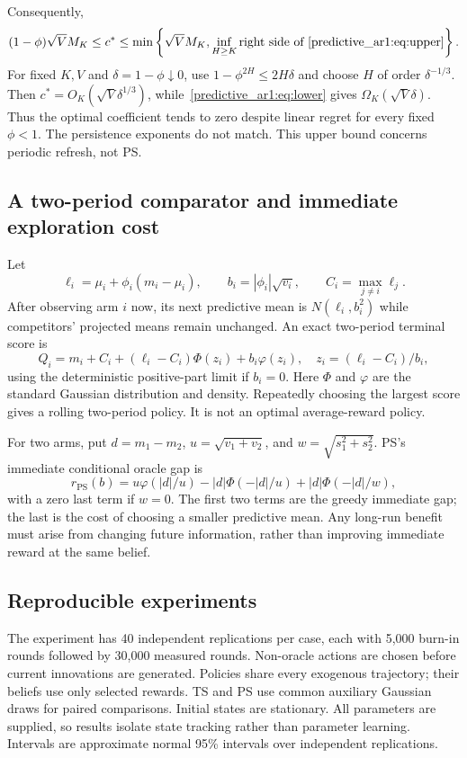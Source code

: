 Consequently,
\begin{equation}
(1-\phi)\sqrt V M_K\leq c^*\leq
\min\left\{\sqrt V M_K,\inf_{H\geq K}\text{right side of~\eqref{predictive_ar1:eq:upper}}\right\}.
\end{equation}
For fixed $K,V$ and $\delta=1-\phi\downarrow0$, use $1-\phi^{2H}\leq2H\delta$ and choose $H$ of order $\delta^{-1/3}$. Then $c^*=O_K(\sqrt V\delta^{1/3})$, while~\eqref{predictive_ar1:eq:lower} gives $\Omega_K(\sqrt V\delta)$. Thus the optimal coefficient tends to zero despite linear regret for every fixed $\phi<1$. The persistence exponents do not match. This upper bound concerns periodic refresh, not PS.

\subsection{A two-period comparator and immediate exploration cost}
Let
\[
\ell_i=\mu_i+\phi_i(m_i-\mu_i),\qquad b_i=|\phi_i|\sqrt{v_i},
\qquad C_i=\max_{j\ne i}\ell_j.
\]
After observing arm $i$ now, its next predictive mean is $N(\ell_i,b_i^2)$ while competitors' projected means remain unchanged. An exact two-period terminal score is
\begin{equation}
Q_i=m_i+C_i+(\ell_i-C_i)\Phi(z_i)+b_i\varphi(z_i),\quad
z_i=(\ell_i-C_i)/b_i,
\end{equation}
using the deterministic positive-part limit if $b_i=0$. Here $\Phi$ and $\varphi$ are the standard Gaussian distribution and density. Repeatedly choosing the largest score gives a rolling two-period policy. It is not an optimal average-reward policy.

For two arms, put $d=m_1-m_2$, $u=\sqrt{v_1+v_2}$, and $w=\sqrt{s_1^2+s_2^2}$. PS's immediate conditional oracle gap is
\begin{equation}
r_{\mathrm{PS}}(b)=u\varphi(|d|/u)-|d|\Phi(-|d|/u)
+|d|\Phi(-|d|/w),
\end{equation}
with a zero last term if $w=0$. The first two terms are the greedy immediate gap; the last is the cost of choosing a smaller predictive mean. Any long-run benefit must arise from changing future information, rather than improving immediate reward at the same belief.

\subsection{Reproducible experiments}
The experiment has 40 independent replications per case, each with 5,000 burn-in rounds followed by 30,000 measured rounds. Non-oracle actions are chosen before current innovations are generated. Policies share every exogenous trajectory; their beliefs use only selected rewards. TS and PS use common auxiliary Gaussian draws for paired comparisons. Initial states are stationary. All parameters are supplied, so results isolate state tracking rather than parameter learning. Intervals are approximate normal 95\% intervals over independent replications.

